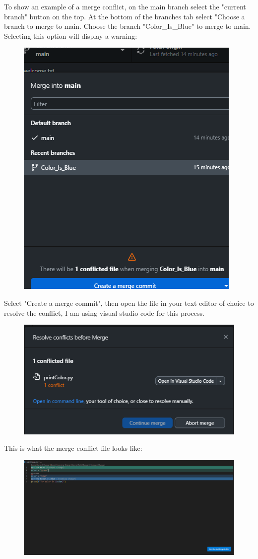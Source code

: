\documentclass{article}
\begin{document}
    To show an example of a merge conflict, on the main branch select the "current branch" button on the top. At the bottom of the branches tab select "Choose a branch to merge to main. Choose the branch "Color_Is_Blue" to merge to main. Selecting this option will display a warning:
    \begin{figure}
        \centering
        \includegraphics[width=.5\linewidth]{MergeError.png}
    \end{figure}
    Select "Create a merge commit", then open the file in your text editor of choice to resolve the conflict, I am using visual studio code for this process.
    \begin{figure}
        \centering
        \includegraphics[width=0.5\linewidth]{MergeResolve.png}
    \end{figure}
    This is what the merge conflict file looks like:
    \begin{figure}
        \centering
        \includegraphics[width=1\linewidth]{MergeConflictFile.png}
    \end{figure}
\end{document}
